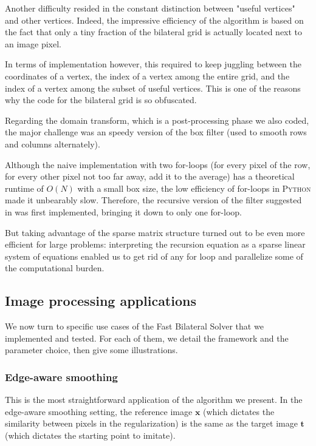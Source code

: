 \documentclass{article}
\begin{document}
\medskip

Another difficulty resided in the constant distinction between "useful vertices" and other vertices. Indeed, the impressive efficiency of the algorithm is based on the fact that only a tiny fraction of the bilateral grid is actually located next to an image pixel.

In terms of implementation however, this required to keep juggling between the coordinates of a vertex, the index of a vertex among the entire grid, and the index of a vertex among the subset of useful vertices. This is one of the reasons why the code for the bilateral grid is so obfuscated.

\medskip

Regarding the domain transform, which is a post-processing phase we also coded, the major challenge was an speedy version of the box filter (used to smooth rows and columns alternately).

Although the naive implementation with two for-loops (for every pixel of the row, for every other pixel not too far away, add it to the average) has a theoretical runtime of $O(N)$ with a small box size, the low efficiency of for-loops in \textsc{Python} made it unbearably slow. Therefore, the recursive version of the filter suggested in \cite{gastal_domain_2011} was first implemented, bringing it down to only one for-loop.

But taking advantage of the sparse matrix structure turned out to be even more efficient for large problems: interpreting the recursion equation as a sparse linear system of equations enabled us to get rid of any for loop and parallelize some of the computational burden.

\subsection{Image processing applications}

We now turn to specific use cases of the Fast Bilateral Solver that we implemented and tested. For each of them, we detail the framework and the parameter choice, then give some illustrations.

\subsubsection{Edge-aware smoothing}

This is the most straightforward application of the algorithm we present. In the edge-aware smoothing setting, the reference image $\textbf{x}$ (which dictates the similarity between pixels in the regularization) is the same as the target image $\textbf{t}$ (which dictates the starting point to imitate).
\end{document}

